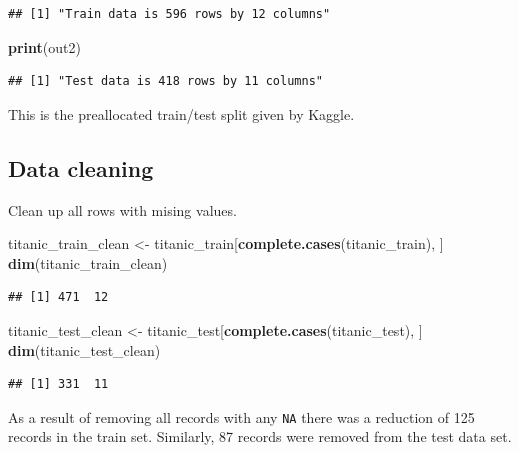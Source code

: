 \documentclass[]{article}
\newenvironment{Shaded}{\begin{snugshade}}{\end{snugshade}}
\newcommand{\KeywordTok}[1]{\textcolor[rgb]{0.13,0.29,0.53}{\textbf{#1}}}
\newcommand{\NormalTok}[1]{#1}
\newcommand{\StringTok}[1]{\textcolor[rgb]{0.31,0.60,0.02}{#1}}
\begin{document}
\begin{verbatim}
## [1] "Train data is 596 rows by 12 columns"
\end{verbatim}

\begin{Shaded}
\begin{Highlighting}[]
\KeywordTok{print}\NormalTok{(out2)}
\end{Highlighting}
\end{Shaded}

\begin{verbatim}
## [1] "Test data is 418 rows by 11 columns"
\end{verbatim}

This is the preallocated train/test split given by Kaggle.

\hypertarget{data-cleaning}{%
\subsection{Data cleaning}\label{data-cleaning}}

Clean up all rows with mising values.

\begin{Shaded}
\begin{Highlighting}[]
\NormalTok{titanic_train_clean <-}\StringTok{ }\NormalTok{titanic_train[}\KeywordTok{complete.cases}\NormalTok{(titanic_train), ]}
\KeywordTok{dim}\NormalTok{(titanic_train_clean)}
\end{Highlighting}
\end{Shaded}

\begin{verbatim}
## [1] 471  12
\end{verbatim}

\begin{Shaded}
\begin{Highlighting}[]
\NormalTok{titanic_test_clean <-}\StringTok{ }\NormalTok{titanic_test[}\KeywordTok{complete.cases}\NormalTok{(titanic_test), ]}
\KeywordTok{dim}\NormalTok{(titanic_test_clean)}
\end{Highlighting}
\end{Shaded}

\begin{verbatim}
## [1] 331  11
\end{verbatim}

As a result of removing all records with any \texttt{NA} there was a
reduction of 125 records in the train set. Similarly, 87 records were
removed from the test data set.
\end{document}
